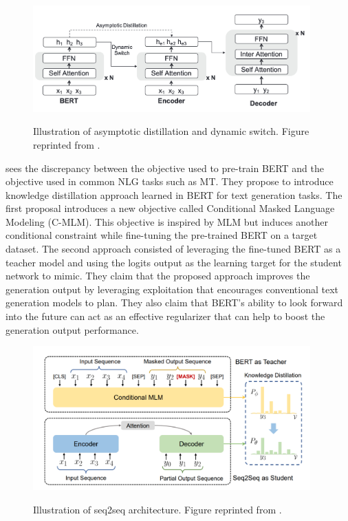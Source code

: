 \begin{figure}[h]
    {\includegraphics[width=0.95\textwidth]{img/ctnmt.png}}
    \centering
    \caption{Illustration of asymptotic distillation and dynamic switch. Figure reprinted from \cite{yang2020towards}.}
    \label{img:ctnmt}
\end{figure}

\cite{chen2019distilling} sees the discrepancy between the objective used to pre-train BERT and the objective used in common NLG tasks such as MT. They propose to introduce knowledge distillation approach learned in BERT for text generation tasks. The first proposal introduces a new objective called Conditional Masked Language Modeling (C-MLM). This objective is inspired by MLM but induces another conditional constraint while fine-tuning the pre-trained BERT on a target dataset. The second approach consisted of leveraging the fine-tuned BERT as a teacher model and using the logits output as the learning target for the student network to mimic. They claim that the proposed approach improves the generation output by leveraging exploitation that encourages conventional text generation models to plan. They also claim that BERT's ability to look forward into the future can act as an effective regularizer that can help to boost the generation output performance.

\begin{figure}[h]
    {\includegraphics[width=0.95\textwidth]{img/bert_distill.png}}
    \centering
    \caption{Illustration of seq2seq architecture. Figure reprinted from \cite{chen2019distilling}.}
    \label{img:bert_distill}
\end{figure}

